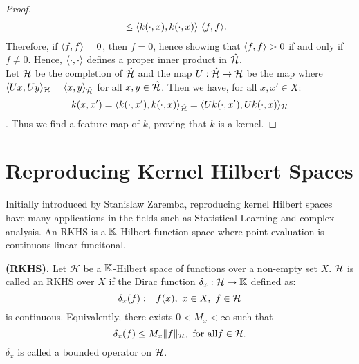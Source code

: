 \documentclass[twoside]{memoir}
\begin{document}
\begin{proof}
\begin{equation*}
\begin{split}
		&\leq \langle k(\cdot, x), k(\cdot, x)\rangle ~ \langle f, f\rangle. 
		\end{split}
		\end{equation*}
		Therefore, if $\langle f, f\rangle = 0$, then $f = 0$, hence showing that $\langle f, f\rangle > 0$ if and only if $f \neq 0$. Hence, $\langle\cdot, \cdot\rangle$ defines a proper inner product in $\hat{\mathcal{H}}$. \\
		Let $\mathcal{H}$ be the completion of $\hat{\mathcal{H}}$ and the map $U: \hat{\mathcal{H}} \rightarrow \mathcal{H}$ be the map where $\langle Ux, Uy\rangle_{\mathcal{H}} = \langle x, y\rangle_{\hat{\mathcal{H}}} $ for all $x, y \in \hat{\mathcal{H}}$. Then we have, for all $x, x' \in X$:
		\[ k(x, x') = \langle k(\cdot, x'), k(\cdot, x)\rangle _{\hat{\mathcal{H}}} = \langle Uk(\cdot, x'), Uk(\cdot, x)\rangle_{\mathcal{H}} \]. Thus we find a feature map of $k$, proving that $k$ is a kernel.
	\end{proof}
	
	\section{Reproducing Kernel Hilbert Spaces} \label{sec:RKHS}
	Initially introduced by Stanislaw Zaremba, reproducing kernel Hilbert spaces have many applications in the fields such as Statistical Learning and complex analysis. An RKHS is a $\mathbb{K}$-Hilbert function space where point evaluation is continuous linear funcitonal.
	\begin{defn}
		\textbf{(RKHS).} Let $\mathcal{H}$ be a $\mathbb{K}$-Hilbert space of functions over a non-empty set $X$. $\mathcal{H}$ is called an RKHS over $X$ if the Dirac function $\delta_x: \mathcal{H} \rightarrow \mathbb{K}$ defined as:
		\[ \delta_x(f) := f(x), ~ x \in X, ~ f \in \mathcal{H} \] is continuous.
		Equivalently, there exists $ 0 < M_x < \infty $ such that
		\[ \delta_x(f) \leq M_x \lVert f\rVert_\mathcal{H}, ~ \text{for all} f \in \mathcal{H}. \]
		$\delta_x$ is called a bounded operator on $\mathcal{H}$.
	\end{defn}
	
\end{document}
